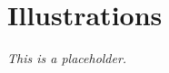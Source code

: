 \documentclass[article]{jss}
\newcommand{\fct}[1]{\code{#1()}}
\begin{document}
\section{Illustrations} \label{sec:illustrations}

\emph{This is a placeholder.}

%
%



%
%
%
%
\end{document}
